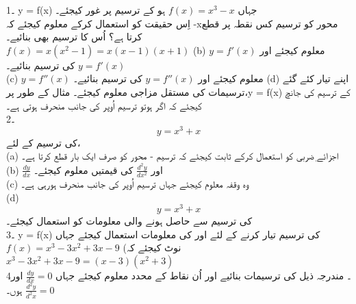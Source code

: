 1۔  y = f(x) جہاں
\( f(x)=x^3-x\)
 ہو کے ترسیم پر غور کیجئے۔\\
  اِس حقیقت کو استعمال کرکے معلوم کیجئے کہ -xمحور کو ترسیم کس نقطہ پر قطع کرتا ہے؟  اُس کا ترسیم بھی بنائیے۔ \\
 	  \(f(x)=x(x^2-1)=x(x-1)(x+1)\)
	(b)   \(y=f'(x)\)  معلوم کیجئے اور  \(y=f'(x)\) کی ترسیم بنائیے۔ \\
	(c)  \(y=f''(x)\) معلوم کیجئے اور  \(y=f''(x)\)  کی ترسیم بنائیے۔
	(d) اپنے تیار کئے گئے ترسیمات کی مستقل مزاجی  معلوم کیجئے۔ مثال کے طور پر،y = f(x) کے ترسیم کی جانچ کیجئے کہ اگر    ہوتو ترسیم اُوپر کی جانب منحرف ہوتی ہے۔ \\
2۔ 
\[y=x^{3}+x\]
 کی ترسیم کے لئے،\\
	(a) اجزائے ٖضربی  کو استعمال کرکے ثابت کیجئے کہ ترسیم -
	محور کو صرف ایک بار قطع کرتا ہے۔ \\
	(b)   \(\frac{dy}{dx}\)
	 اور  
	 \(\frac{d^{2}y}{dx^{2}}\)
	  کی قیمتیں معلوم کیجئے۔ \\
	(c) وہ وقفہ معلوم کیجئے جہاں ترسیم اُوپر کی جانب منحرف ہورہی ہے۔\\
	(d) \[y=x^{3}+x\]
	 کی ترسیم سے حاصل ہونے والی معلومات کو استعمال کیجئے۔ \\
3۔ y = f(x)  کی ترسیم تیار کرنے کے لئے  اور   کی معلومات استعمال کیجئے جہاں\\
\(f(x)=x^{3}-3x^{2}+3x-9\)
(نوٹ کیجئے کہ
  \(x^3-3x^2+3x-9=(x-3)(x^2+3)\)\\
4۔ مندرجہ ذیل کی ترسیمات بنائیے اور اُن نقاط کے محدد معلوم کیجئے جہاں
 \(\frac{dy}{dx}=0\)
  اور 
  \(\frac{d^2y}{d^2x}=0\)
   ہوں۔\\
    
